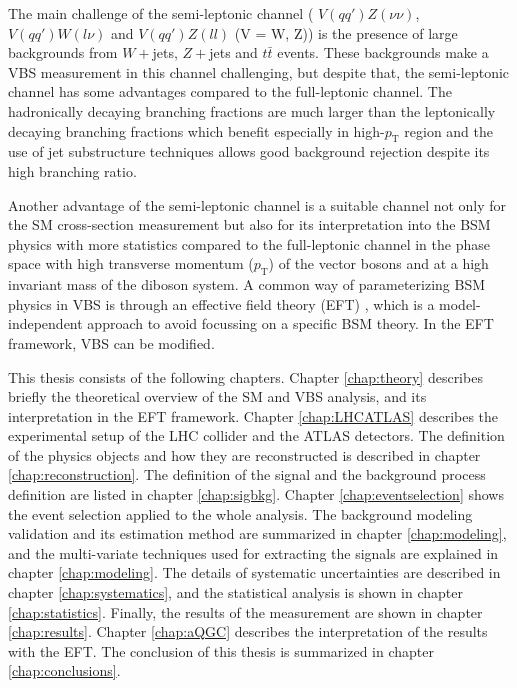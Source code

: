 The main challenge of the semi-leptonic channel ( $V(qq')Z(\nu\nu)$, $V(qq')W(l\nu)$ and $V(qq')Z(ll)$ (V = W, Z)) is the presence of large backgrounds from $W + $jets, $Z + $jets and $t\bar{t}$ events. 
These backgrounds make a VBS measurement in this channel challenging, but despite that, the semi-leptonic channel has some advantages compared to the full-leptonic channel. 
The hadronically decaying branching fractions are much larger than the leptonically decaying branching fractions which benefit especially in high-$p_\mathrm{T}$ region and the use of jet substructure techniques allows good background rejection despite its high branching ratio. 

Another advantage of the semi-leptonic channel is a suitable channel not only for the SM cross-section measurement but also for its interpretation into the BSM physics with more statistics compared to the full-leptonic channel in the phase space with high transverse momentum ($p_\mathrm{T}$) of the vector bosons and at a high invariant mass of the diboson system.
A common way of parameterizing BSM physics in VBS is through an effective field theory (EFT) \cite{Longhitano:1980tm}, which is a model-independent approach to avoid focussing on a specific BSM theory. In the EFT framework, VBS can be modified. 


This thesis consists of the following chapters.
Chapter \ref{chap:theory} describes briefly the theoretical overview of the SM and VBS analysis, and its interpretation in the EFT framework. 
Chapter \ref{chap:LHCATLAS} describes the experimental setup of the LHC collider and the ATLAS detectors. 
The definition of the physics objects and how they are reconstructed is described in chapter \ref{chap:reconstruction}. 
The definition of the signal and the background process definition are listed in chapter \ref{chap:sigbkg}. Chapter \ref{chap:eventselection} shows the event selection applied to the whole analysis.
The background modeling validation and its estimation method are summarized in chapter \ref{chap:modeling}, and the multi-variate techniques used for extracting the signals are explained in chapter \ref{chap:modeling}. The details of systematic uncertainties are described in chapter \ref{chap:systematics}, and the statistical analysis is shown in chapter \ref{chap:statistics}. Finally, the results of the measurement are shown in chapter \ref{chap:results}. 
Chapter \ref{chap:aQGC} describes the interpretation of the results with the EFT. The conclusion of this thesis is summarized in chapter \ref{chap:conclusions}.
